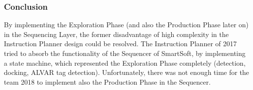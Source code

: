 \subsubsection{Conclusion }

By implementing the Exploration Phase (and also the Production Phase later on) in the Sequencing Layer, the former disadvantage of high complexity in the Instruction Planner design could be resolved. The Instruction Planner of 2017 tried to absorb the functionality of the Sequencer of SmartSoft, by implementing a state machine, which represented the Exploration Phase completely (detection, docking, ALVAR tag detection).
Unfortunately, there was not enough time for the team 2018 to implement also the Production Phase in the Sequencer.
